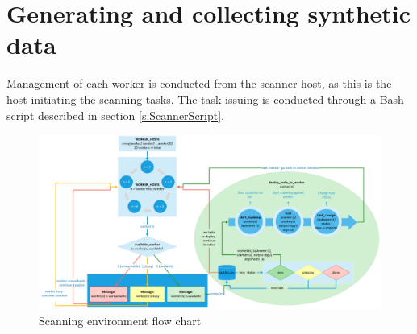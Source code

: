 \newpage
\section{Generating and collecting synthetic data}
\label{s:DataGAGeneration}
\label{s:DataGeneration}


Management of each worker is conducted from the scanner host, as this is the host initiating the scanning tasks.
The task issuing is conducted through a Bash script described in section \ref{s:ScannerScript}.

\begin{figure}[htbp]
\centerline{\includegraphics[scale=0.43]{images/lab/ScannerFlowChart.png}}
\caption{Scanning environment flow chart}
\label{fig:ScannerFlowChart}
\end{figure}

